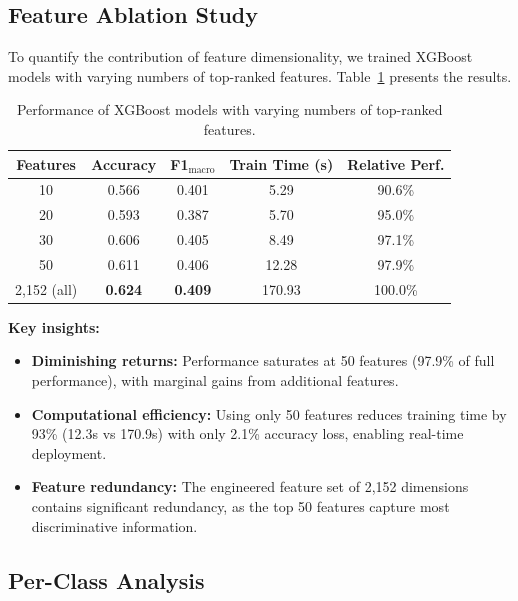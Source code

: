 \subsection{Feature Ablation Study}
\label{subsec:feature-ablation}

To quantify the contribution of feature dimensionality, we trained XGBoost models with varying numbers of top-ranked features. Table~\ref{tab:ablation} presents the results.

\begin{table}[t]
\centering
\caption{Performance of XGBoost models with varying numbers of top-ranked features.}
\label{tab:ablation}
\begin{tabular}{ccccc}
\toprule
\textbf{Features} & \textbf{Accuracy} & \textbf{F1$_{\text{macro}}$} & \textbf{Train Time (s)} & \textbf{Relative Perf.} \\
\midrule
10 & 0.566 & 0.401 & 5.29 & 90.6\% \\
20 & 0.593 & 0.387 & 5.70 & 95.0\% \\
30 & 0.606 & 0.405 & 8.49 & 97.1\% \\
50 & 0.611 & 0.406 & 12.28 & 97.9\% \\
2,152 (all) & \textbf{0.624} & \textbf{0.409} & 170.93 & 100.0\% \\
\bottomrule
\end{tabular}
\end{table}

\textbf{Key insights:}
\begin{itemize}
    \item \textbf{Diminishing returns:} Performance saturates at 50 features (97.9\% of full performance), with marginal gains from additional features.
    
    \item \textbf{Computational efficiency:} Using only 50 features reduces training time by 93\% (12.3s vs 170.9s) with only 2.1\% accuracy loss, enabling real-time deployment.
    
    \item \textbf{Feature redundancy:} The engineered feature set of 2,152 dimensions contains significant redundancy, as the top 50 features capture most discriminative information.
\end{itemize}

\subsection{Per-Class Analysis}
\label{subsec:per-class-analysis}

